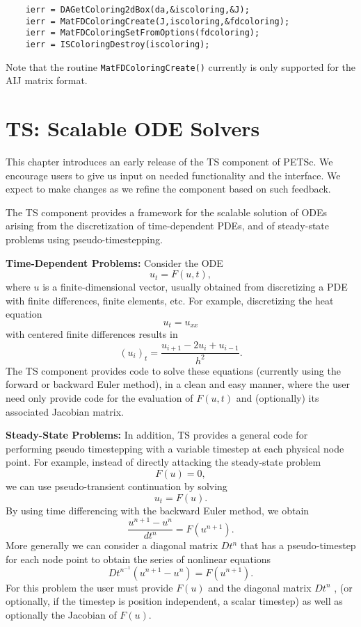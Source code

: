 \begin{verbatim}
    ierr = DAGetColoring2dBox(da,&iscoloring,&J);
    ierr = MatFDColoringCreate(J,iscoloring,&fdcoloring); 
    ierr = MatFDColoringSetFromOptions(fdcoloring);
    ierr = ISColoringDestroy(iscoloring);
\end{verbatim}

Note that the routine {\tt MatFDColoringCreate()} currently is only 
supported for the AIJ matrix format.

\chapter{TS: Scalable ODE Solvers}

This chapter introduces an early release of the TS component of PETSc.
We encourage users to give us input on needed functionality and the
interface.  We expect to make changes as we refine the component based
on such feedback.

\medskip \medskip

The TS component provides a framework for the scalable solution of ODEs
arising from the discretization of time-dependent PDEs, and of
steady-state problems using pseudo-timestepping.

\vspace{.2cm}

\noindent
{\bf Time-Dependent Problems:} Consider the ODE
\[
              u_t = F(u,t),
\]
where $ u $ is a finite-dimensional vector, usually obtained from
discretizing a PDE with finite differences, finite elements, etc.
For example, discretizing the heat equation 
\[
          u_t = u_{xx} 
\]
with centered finite differences results in 
\[
          (u_i)_t = \frac{u_{i+1} - 2 u_{i} + u_{i-1}}{h^2}.
\]
The TS component provides code to solve these equations (currently 
using the forward or backward Euler method), in a clean and easy manner,
where the user need only provide code for the evaluation of $ F(u,t) $ and 
(optionally) its associated Jacobian matrix.

\vspace{.2cm}

\noindent
{\bf Steady-State Problems:} 
In addition, TS provides a general code for performing pseudo timestepping
with a variable timestep at each physical node point. For example, instead of
directly attacking the steady-state problem
\[
           F(u) = 0,
\]
we can use pseudo-transient continuation by solving
\[
           u_t = F(u).
\]
By using time differencing with the backward Euler method, we obtain
\[
           \frac{u^{n+1} - u^{n}}{dt^{n}} = F(u^{n+1}).
\]
More generally we can consider a diagonal matrix $ Dt^{n} $ that has a
pseudo-timestep for each node point to obtain the series of nonlinear equations
\[
        Dt^{n^{-1}}(u^{n+1} - u^{n}) =  F(u^{n+1}).
\]
For this problem the user must provide $ F(u) $ and the diagonal 
matrix $ Dt^{n} $ , (or optionally, if the timestep is position independent,
a scalar timestep) as well as optionally the Jacobian of $ F(u) .$ 

